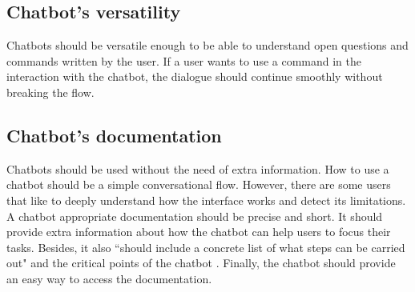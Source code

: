 \documentclass[a4paper,10pt]{article}
\begin{document}
\subsection*{Chatbot's versatility}

Chatbots should be versatile enough to be able to understand open questions and commands written by the user. If a user wants to use a command in the interaction with the chatbot, the dialogue should continue smoothly without breaking the flow.

\subsection*{Chatbot's documentation}

Chatbots should be used without the need of extra information. How to use a chatbot should be a simple conversational flow. However, there are some users that like to deeply understand how the interface works and detect its limitations. A chatbot appropriate documentation should be precise and short. It should provide extra information about how the chatbot can help users to focus their tasks. Besides, it also ``should include a concrete list of what steps can be carried out" and the critical points of the chatbot \cite{HeuristicsWebPage}. Finally, the chatbot should provide an easy way to access the documentation.   


\medskip


\end{document}

